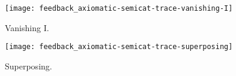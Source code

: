 \begin{figure}[h!]
    \centering
    \texttt{[image: feedback\_axiomatic-semicat-trace-vanishing-I]}
    \caption{Vanishing I.}
    \label{fig:axiomatic-semicat-trace-vanishing-I}
\end{figure}

\begin{figure}[h!]
    \centering
    \texttt{[image: feedback\_axiomatic-semicat-trace-superposing]}
    \caption{Superposing.}
    \label{fig:axiomatic-semicat-trace-superposing}
\end{figure}

